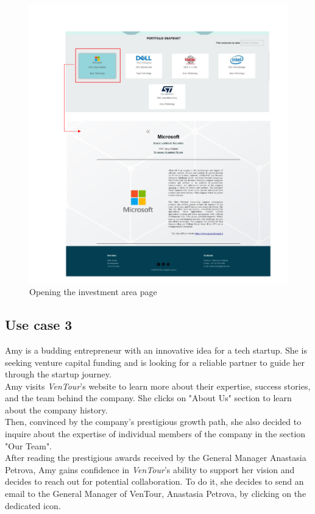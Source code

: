 \documentclass[../../DD.tex]{subfiles}
\begin{document}
\begin{figure}[!htb]
       \centering
       \includegraphics[width=\textwidth]{Images/scenarios/scenario investments4.png}
       \caption{Opening the investment area page}
       \label{fig:scen1-4}
   \end{figure}

  \clearpage

		\newpage
		\subsection{Use case 3}
            Amy is a budding entrepreneur with an innovative idea for a tech startup. She is seeking venture capital funding and is looking for a reliable partner to guide her through the startup journey.\\
            Amy visits \textit{VenTour}'s website to learn more about their expertise, success stories, and the team behind the company. She clicks on "About Us" section to learn about the company history.\\
            Then, convinced by the company's prestigious growth path, she also decided to inquire about the expertise of individual members of the company in the section "Our Team".\\
            After reading the prestigious awards received by the General Manager Anastasia Petrova, Amy gains confidence in \textit{VenTour}'s ability to support her vision and decides to reach out for potential collaboration. To do it, she decides to send an email to the General Manager of VenTour, Anastasia Petrova, by clicking on the dedicated icon.
            
\end{document}
